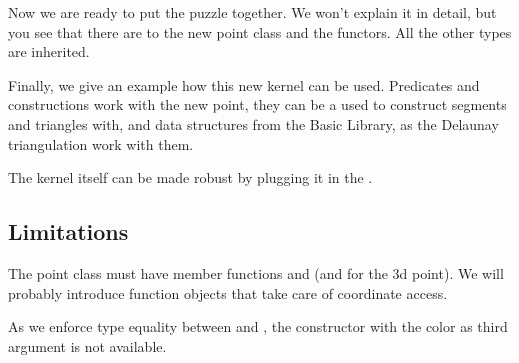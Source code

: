 Now we are ready to put the puzzle together. We won't explain it in
detail, but you see that there are  to the new point
class and the functors. All the other types are inherited.



\ccHtmlLinksOff


\ccHtmlLinksOn



Finally, we give an example how this new kernel can be used.
Predicates and constructions work with the new point, they
can be a used to construct segments and triangles with, and
data structures from the Basic Library, as the Delaunay
triangulation work with them.  

The kernel itself can be
made robust by plugging it in the .


\ccHtmlLinksOff
{}
\ccHtmlLinksOn


\subsection{Limitations}

The point class must have member functions  and 
(and  for the 3d point). We will probably
introduce function objects that take care of coordinate
access.


As we enforce type equality between  and ,
the constructor with the color as third argument is not available.









